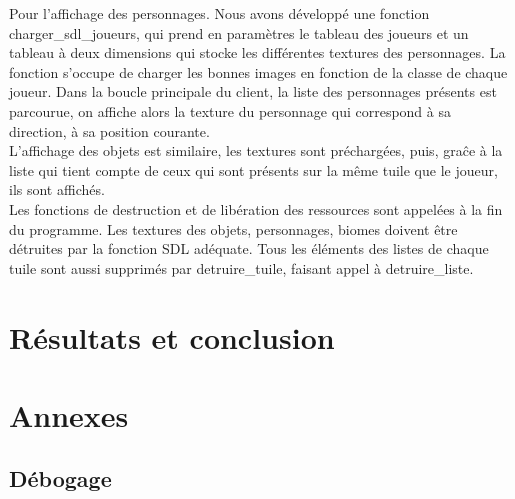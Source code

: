 \documentclass[11pt]{article}
\begin{document}
            Pour l’affichage des personnages. Nous avons développé une fonction charger\_sdl\_joueurs, qui prend en paramètres le tableau des joueurs et un tableau 
            à deux dimensions qui stocke les différentes textures des personnages. La fonction s’occupe de charger les bonnes images en fonction de la classe de chaque joueur. 
            Dans la boucle principale du client, la liste des personnages présents est parcourue, on affiche alors la texture du personnage qui correspond à sa direction, 
            à sa position courante.\\
            L’affichage des objets est similaire, les textures sont préchargées, puis, graĉe à la liste qui tient compte de ceux qui sont présents sur la même tuile 
            que le joueur, ils sont affichés.\\
            Les fonctions de destruction et de libération des ressources sont appelées à la fin du programme. 
            Les textures des objets, personnages, biomes doivent être détruites par la fonction SDL adéquate. 
            Tous les éléments des listes de chaque tuile sont aussi supprimés par detruire\_tuile, faisant appel à detruire\_liste.

                
    \section{Résultats et conclusion}
    \section{Annexes}
        \subsection{Débogage}
        
\end{document}
